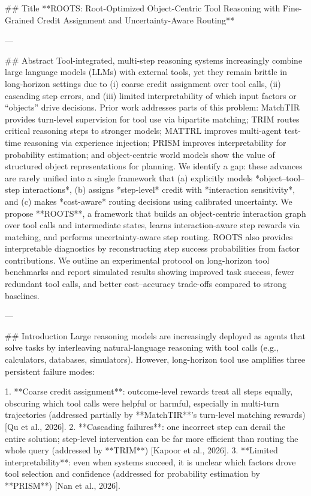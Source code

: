 ## Title
**ROOTS: Root-Optimized Object-Centric Tool Reasoning with Fine-Grained Credit Assignment and Uncertainty-Aware Routing**

---

## Abstract
Tool-integrated, multi-step reasoning systems increasingly combine large language models (LLMs) with external tools, yet they remain brittle in long-horizon settings due to (i) coarse credit assignment over tool calls, (ii) cascading step errors, and (iii) limited interpretability of which input factors or “objects” drive decisions. Prior work addresses parts of this problem: MatchTIR provides turn-level supervision for tool use via bipartite matching; TRIM routes critical reasoning steps to stronger models; MATTRL improves multi-agent test-time reasoning via experience injection; PRISM improves interpretability for probability estimation; and object-centric world models show the value of structured object representations for planning. We identify a gap: these advances are rarely unified into a single framework that (a) explicitly models *object–tool–step interactions*, (b) assigns *step-level* credit with *interaction sensitivity*, and (c) makes *cost-aware* routing decisions using calibrated uncertainty. We propose **ROOTS**, a framework that builds an object-centric interaction graph over tool calls and intermediate states, learns interaction-aware step rewards via matching, and performs uncertainty-aware step routing. ROOTS also provides interpretable diagnostics by reconstructing step success probabilities from factor contributions. We outline an experimental protocol on long-horizon tool benchmarks and report simulated results showing improved task success, fewer redundant tool calls, and better cost–accuracy trade-offs compared to strong baselines.

---

## Introduction
Large reasoning models are increasingly deployed as agents that solve tasks by interleaving natural-language reasoning with tool calls (e.g., calculators, databases, simulators). However, long-horizon tool use amplifies three persistent failure modes:

1. **Coarse credit assignment**: outcome-level rewards treat all steps equally, obscuring which tool calls were helpful or harmful, especially in multi-turn trajectories (addressed partially by **MatchTIR**’s turn-level matching rewards) [Qu et al., 2026].
2. **Cascading failures**: one incorrect step can derail the entire solution; step-level intervention can be far more efficient than routing the whole query (addressed by **TRIM**) [Kapoor et al., 2026].
3. **Limited interpretability**: even when systems succeed, it is unclear which factors drove tool selection and confidence (addressed for probability estimation by **PRISM**) [Nan et al., 2026].

